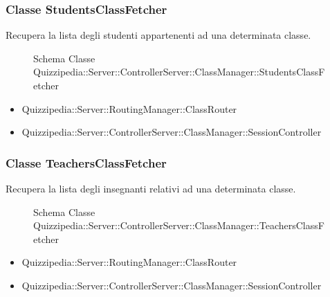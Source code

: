 \subsubsection{Classe StudentsClassFetcher}
Recupera la lista degli studenti appartenenti ad una determinata classe.
\begin{figure}[H]
\centering
\noindent{}
\caption[Schema Classe StudentsClassFetcher]{Schema Classe Quizzipedia::Server::ControllerServer::ClassManager::StudentsClassFetcher}
\end{figure}
\begin{itemize}
\item Quizzipedia::Server::RoutingManager::ClassRouter
\end{itemize}
\begin{itemize}
\item Quizzipedia::Server::ControllerServer::ClassManager::SessionController
\end{itemize}
\subsubsection{Classe TeachersClassFetcher}
Recupera la lista degli insegnanti relativi ad una determinata classe.
\begin{figure}[H]
\centering
\noindent{}
\caption[Schema Classe TeachersClassFetcher]{Schema Classe Quizzipedia::Server::ControllerServer::ClassManager::TeachersClassFetcher}
\end{figure}
\begin{itemize}
\item Quizzipedia::Server::RoutingManager::ClassRouter
\end{itemize}
\begin{itemize}
\item Quizzipedia::Server::ControllerServer::ClassManager::SessionController
\end{itemize}

